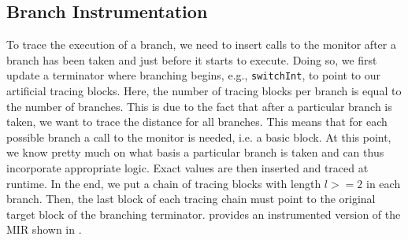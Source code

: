 \documentclass[paper=a4,%
  twoside,%
  BCOR4mm,%
  abstract=true,%
  toc=bibliography,%
  chapterprefix=true,%
  toc=bibliographynumbered,%
  open=right,%
  english,%
  pagesize=pdftex]{scrreprt}
\begin{document}
\subsection{Branch Instrumentation}
To trace the execution of a branch, we need to insert calls to the monitor after a branch has been taken and just before it starts to execute. Doing so, we first update a terminator where branching begins, e.g., \lstinline{switchInt}, to point to our artificial tracing blocks. Here, the number of tracing blocks per branch is equal to the number of branches. This is due to the fact that after a particular branch is taken, we want to trace the distance for all branches. This means that for each possible branch a call to the monitor is needed, i.e. a basic block. At this point, we know pretty much on what basis a particular branch is taken and can thus incorporate appropriate logic. Exact values are then inserted and traced at runtime. In the end, we put a chain of tracing blocks with length $l >= 2$ in each branch. Then, the last block of each tracing chain must point to the original target block of the branching terminator.  provides an instrumented version of the \ac{MIR} shown in .
\end{document}

